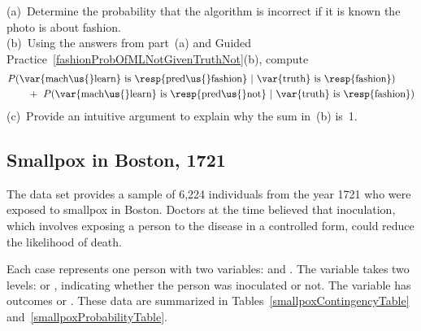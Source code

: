 \begin{exercisewrap}
\begin{nexercise}\label{whyCondProbSumTo1}
(a)~Determine the probability that the algorithm is incorrect
if it is known the photo is about fashion. \\[1mm]
(b)~Using the answers from part~(a) and
Guided Practice~\ref{fashionProbOfMLNotGivenTruthNot}(b),
compute
\begin{align*}
&P(\text{\var{mach\us{}learn} is \resp{pred\us{}fashion}}
    \ |\ \text{\var{truth} is \resp{fashion}}) \\
&\qquad  +\ P(\text{\var{mach\us{}learn} is \resp{pred\us{}not}}
    \ |\ \text{\var{truth} is \resp{fashion}})
\end{align*}
(c)~Provide an intuitive argument to explain why the sum
in~(b) is~1.\footnotemark
\end{nexercise}
\end{exercisewrap}



\subsection{Smallpox in Boston, 1721}


The  data set provides a sample of 6,224 individuals from the year 1721 who were exposed to smallpox in Boston.
Doctors at the time believed that inoculation, which involves exposing a person to the disease in a controlled form, could reduce the likelihood of death.

Each case represents one person with two variables:  and . The variable  takes two levels:  or , indicating whether the person was inoculated or not. The variable  has outcomes  or . These data are summarized in Tables~\ref{smallpoxContingencyTable} and~\ref{smallpoxProbabilityTable}.

